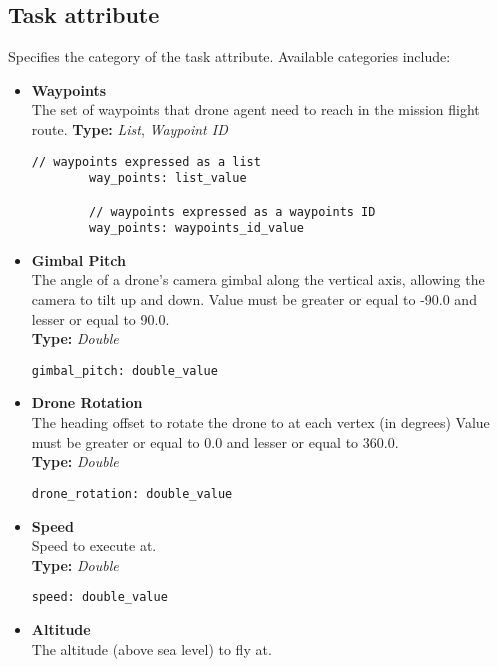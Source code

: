 \subsection{Task attribute}Specifies the category of the task attribute. Available categories include:
    \begin{itemize}
        \item \textbf{Waypoints} \\
        The set of waypoints that drone agent need to reach in the mission flight route.
        \textbf{Type:} \textit{List},  \textit{Waypoint ID} 
        \begin{lstlisting}[style=customgo]
        // waypoints expressed as a list
        way_points: list_value

        // waypoints expressed as a waypoints ID
        way_points: waypoints_id_value
        \end{lstlisting}
        \item \textbf{Gimbal Pitch} \\
        The angle of a drone's camera gimbal along the vertical axis, allowing the camera to tilt up and down. Value must be greater or equal to -90.0 and lesser or equal to 90.0. \\
        \textbf{Type:} \textit{Double}
        \begin{lstlisting}[style=customgo]
        gimbal_pitch: double_value
        \end{lstlisting}
        \item \textbf{Drone Rotation} \\
        The heading offset to rotate the drone to at each vertex (in degrees) Value must be greater or equal to 0.0 and lesser or equal to 360.0. \\
        \textbf{Type:} \textit{Double}
        \begin{lstlisting}[style=customgo]
        drone_rotation: double_value
        \end{lstlisting} 
        \item \textbf{Speed} \\
        Speed to execute at. \\
        \textbf{Type:} \textit{Double}
        \begin{lstlisting}[style=customgo]
        speed: double_value
        \end{lstlisting}
        \item \textbf{Altitude} \\
        The altitude (above sea level) to fly at. \\

\end{itemize}
